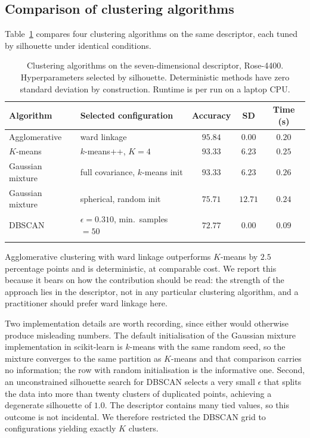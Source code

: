 \documentclass[pdflatex,sn-basic]{sn-jnl}
\theoremstyle{thmstyleone}%
\theoremstyle{thmstyletwo}%
\theoremstyle{thmstylethree}%
\begin{document}
\subsection{Comparison of clustering algorithms}\label{sec:algos}

Table~\ref{tab:algorithms} compares four clustering algorithms on the same
descriptor, each tuned by silhouette under identical conditions.

\begin{table}[h]
\centering
\caption{Clustering algorithms on the seven-dimensional descriptor, Rose-4400.
Hyperparameters selected by silhouette. Deterministic methods have zero
standard deviation by construction. Runtime is per run on a laptop
CPU.}\label{tab:algorithms}
\begin{tabular}{@{}llccc@{}}
\toprule
Algorithm & Selected configuration & Accuracy & SD & Time (s) \\
\midrule
Agglomerative    & ward linkage & $\mathbf{95.84}$ & $0.00$ & $0.20$ \\
$K$-means        & $k$-means++, $K=4$ & $93.33$ & $6.23$ & $0.25$ \\
Gaussian mixture & full covariance, $k$-means init & $93.33$ & $6.23$ & $0.26$ \\
Gaussian mixture & spherical, random init & $75.71$ & $12.71$ & $0.24$ \\
DBSCAN           & $\epsilon=0.310$, min.\ samples $=50$ & $72.77$ & $0.00$ & $0.09$ \\
\botrule
\end{tabular}
\end{table}

Agglomerative clustering with ward linkage outperforms $K$-means by $2.5$
percentage points and is deterministic, at comparable cost. We report this
because it bears on how the contribution should be read: the strength of the
approach lies in the descriptor, not in any particular clustering algorithm,
and a practitioner should prefer ward linkage here.

Two implementation details are worth recording, since either would otherwise
produce misleading numbers. The default initialisation of the Gaussian mixture
implementation in scikit-learn is $k$-means with the same random seed, so the
mixture converges to the same partition as $K$-means and that comparison
carries no information; the row with random initialisation is the informative
one. Second, an unconstrained silhouette search for DBSCAN selects a very small
$\epsilon$ that splits the data into more than twenty clusters of duplicated
points, achieving a degenerate silhouette of $1.0$. The descriptor contains
many tied values, so this outcome is not incidental. We therefore restricted
the DBSCAN grid to configurations yielding exactly $K$ clusters.
\end{document}
